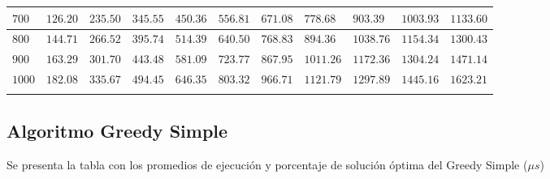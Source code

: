 \documentclass[12pt]{article}
\begin{document}
\begin{tabu}{|@{}*{11}{p{1.4cm}@{}|}}
$700$ & $126.20$ & $235.50$ & $345.55$ & $450.36$ & $556.81$ & $671.08$ & $778.68$ & $903.39$ & $1003.93$ & $1133.60$ \\\hline
$800$ & $144.71$ & $266.52$ & $395.74$ & $514.39$ & $640.50$ & $768.83$ & $894.36$ & $1038.76$ & $1154.34$ & $1300.43$ \\\hline
$900$ & $163.29$ & $301.70$ & $443.48$ & $581.09$ & $723.77$ & $867.95$ & $1011.26$ & $1172.36$ & $1304.24$ & $1471.14$ \\\hline
$1000$ & $182.08$ & $335.67$ & $494.45$ & $646.35$ & $803.32$ & $966.71$ & $1121.79$ & $1297.89$ & $1445.16$ & $1623.21$ \\\hline
{}%
\end{tabu}
\pagebreak
\subsection*{Algoritmo Greedy Simple}
Se presenta la tabla con los promedios de ejecuci\'on y porcentaje de soluci\'on \'optima del Greedy Simple ($\mu s$)\\
\end{document}
